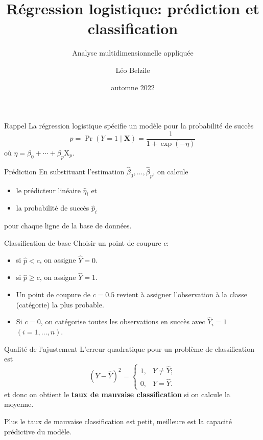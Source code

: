\documentclass[
  ignorenonframetext,
]{beamer}
\title{Régression logistique: prédiction et classification}
\subtitle{Analyse multidimensionnelle appliquée}
\author{Léo Belzile}
\date{automne 2022}
\institute{HEC Montréal}
\providecommand{\tightlist}{%
  \setlength{\itemsep}{0pt}\setlength{\parskip}{0pt}}\usepackage{longtable,booktabs,array}
\begin{document}
\frame{\titlepage}
\ifdefined\Shaded\renewenvironment{Shaded}{\begin{tcolorbox}[enhanced, breakable, boxrule=0pt, borderline west={3pt}{0pt}{shadecolor}, frame hidden, sharp corners, interior hidden]}{\end{tcolorbox}}\fi

\begin{frame}{Rappel}
\protect\hypertarget{rappel}{}
La régression logistique spécifie un modèle pour la probabilité de
succès \[p = \Pr(Y=1 \mid \mathbf{X}) = \frac{1}{1+\exp(-\eta)}\] où
\(\eta = \beta_0 + \cdots + \beta_p \mathrm{X}_p\).
\end{frame}

\begin{frame}{Prédiction}
\protect\hypertarget{pruxe9diction}{}
En substituant l'estimation
\(\widehat{\beta}_0, \ldots, \widehat{\beta}_p\), on calcule

\begin{itemize}
\tightlist
\item
  le prédicteur linéaire \(\widehat{\eta}_i\) et
\item
  la probabilité de succès \(\widehat{p}_i\)
\end{itemize}

pour chaque ligne de la base de données.
\end{frame}

\begin{frame}{Classification de base}
\protect\hypertarget{classification-de-base}{}
Choisir un point de coupure \(c\):

\begin{itemize}
\item
  si \(\widehat{p} < c\), on assigne \(\widehat{Y}=0\).
\item
  si \(\widehat{p} \geq c\), on assigne \(\widehat{Y}=1\).
\item
  Un point de coupure de \(c=0.5\) revient à assigner l'observation à la
  classe (catégorie) la plus probable.
\item
  Si \(c=0\), on catégorise toutes les observations en succès avec
  \(\widehat{Y}_i=1\) \((i=1, \ldots, n)\).
\end{itemize}
\end{frame}

\begin{frame}{Qualité de l'ajustement}
\protect\hypertarget{qualituxe9-de-lajustement}{}
L'erreur quadratique pour un problème de classification est
\[(Y-\widehat{Y})^2 = \begin{cases} 1, & Y \neq \widehat{Y}; \\0, & Y = \widehat{Y}.\end{cases}\]
et donc on obtient le \textbf{taux de mauvaise classification} si on
calcule la moyenne.

Plus le taux de mauvaise classification est petit, meilleure est la
capacité prédictive du modèle.
\end{frame}
\end{document}
